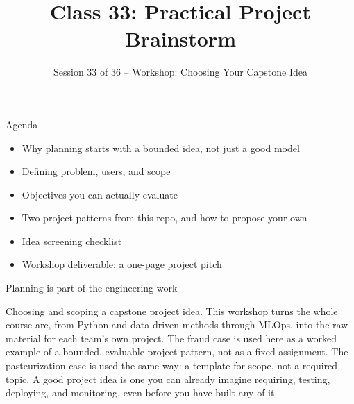 

\title{Class 33: Practical Project Brainstorm}
\subtitle{Session 33 of 36 -- Workshop: Choosing Your Capstone Idea}
\author{\coursename}
\date{}



\frame{\titlepage \coursefooter}

\begin{frame}{Agenda}
\begin{itemize}
\item Why planning starts with a bounded idea, not just a good model
\item Defining problem, users, and scope
\item Objectives you can actually evaluate
\item Two project patterns from this repo, and how to propose your own
\item Idea screening checklist
\item Workshop deliverable: a one-page project pitch
\end{itemize}
\coursefooter
\end{frame}

\begin{frame}{Planning is part of the engineering work}
\coursefooter
\end{frame}

\coursecontextframe
{Choosing and scoping a capstone project idea.}
{This workshop turns the whole course arc, from Python and data-driven methods through MLOps, into the raw material for each team's own project.}
{The fraud case is used here as a worked example of a bounded, evaluable project pattern, not as a fixed assignment.}
{The pasteurization case is used the same way: a template for scope, not a required topic.}
{A good project idea is one you can already imagine requiring, testing, deploying, and monitoring, even before you have built any of it.}

